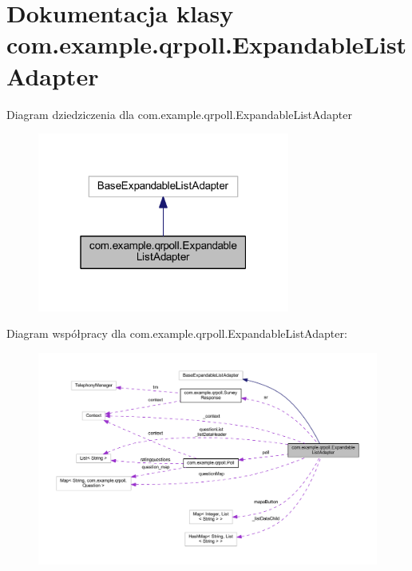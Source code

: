 \hypertarget{classcom_1_1example_1_1qrpoll_1_1_expandable_list_adapter}{\section{Dokumentacja klasy com.\+example.\+qrpoll.\+Expandable\+List\+Adapter}
\label{classcom_1_1example_1_1qrpoll_1_1_expandable_list_adapter}
}


Diagram dziedziczenia dla com.\+example.\+qrpoll.\+Expandable\+List\+Adapter
\nopagebreak
\begin{figure}[H]
\begin{center}
\leavevmode
\includegraphics[width=235pt]{classcom_1_1example_1_1qrpoll_1_1_expandable_list_adapter__inherit__graph}
\end{center}
\end{figure}


Diagram współpracy dla com.\+example.\+qrpoll.\+Expandable\+List\+Adapter\+:
\nopagebreak
\begin{figure}[H]
\begin{center}
\leavevmode
\includegraphics[width=350pt]{classcom_1_1example_1_1qrpoll_1_1_expandable_list_adapter__coll__graph}
\end{center}
\end{figure}
